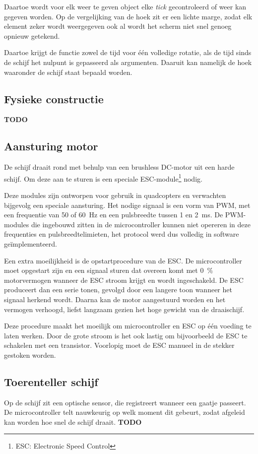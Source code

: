 \documentclass[a4paper, 12pt]{article}
\newcommand{\TODO}{\large\textbf{TODO}}
\begin{document}
Daartoe wordt voor elk weer te geven object elke \emph{tick} gecontroleerd of
weer kan gegeven worden. Op de vergelijking van de hoek zit er een lichte marge,
zodat elk element zeker wordt weergegeven ook al wordt het scherm niet snel
genoeg opnieuw getekend.

Daartoe krijgt de functie zowel de tijd voor één volledige rotatie,
als de tijd sinds de schijf het nulpunt is gepasseerd als argumenten.
Daaruit kan namelijk de hoek waaronder de schijf staat bepaald worden.

\subsection{Fysieke constructie}
\TODO

\subsection{Aansturing motor}
De schijf draait rond met behulp van een brushless DC-motor uit een harde schijf.
Om deze aan te sturen is een speciale ESC-module\footnote{ESC: Electronic Speed Control} nodig.

Deze modules zijn ontworpen voor gebruik in quadcopters en verwachten bijgevolg
een speciale aansturing.
Het nodige signaal is een vorm van PWM, met een frequentie van 50 of
\SI{60}{\hertz}
en een pulsbreedte tussen 1 en \SI{2}{\milli\second}.
De PWM-modules die ingebouwd zitten in de microcontroller kunnen niet opereren
in deze frequenties en pulsbreedtelimieten,
het protocol werd dus volledig in software geïmplementeerd.

Een extra moeilijkheid is de opstartprocedure van de ESC.
De microcontroller moet opgestart zijn en een signaal sturen dat overeen komt
met \SI{0}{\percent} motorvermogen wanneer de ESC stroom krijgt en wordt
ingeschakeld. De ESC produceert dan een serie tonen, gevolgd door een langere
toon wanneer het signaal herkend wordt. Daarna kan de motor aangestuurd worden
en het vermogen verhoogd, liefst langzaam gezien het hoge gewicht van de draaischijf.

Deze procedure maakt het moeilijk om microcontroller en ESC op één voeding te
laten werken. Door de grote stroom is het ook lastig om bijvoorbeeld de ESC te
schakelen met een transistor. Voorlopig moet de ESC manueel in de stekker
gestoken worden.

\subsection{Toerenteller schijf}
Op de schijf zit een optische sensor, die registreert wanneer een gaatje
passeert. De microcontroller telt nauwkeurig op welk moment dit gebeurt,
zodat afgeleid kan worden hoe snel de schijf draait.
\TODO
\end{document}
